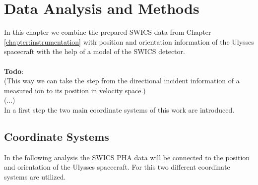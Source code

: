 
\chapter{Data Analysis and Methods} %

\label{chapter:data} 





In this chapter we combine the prepared SWICS data from Chapter \ref{chapter:instrumentation} with position and orientation information of the Ulysses spacecraft with the help of a model of the SWICS detector. \\ \\
\textbf{Todo}: \\(This way we can take the step from the directional incident information of a measured ion to its position in velocity space.) \\
(...)\\
In a first step the two main coordinate systems of this work are introduced.

\section{Coordinate Systems}
\label{sec:cs}
In the following analysis the SWICS PHA data will be connected to the position and orientation of the Ulysses spacecraft. For this two different coordinate systems are utilized.

%
